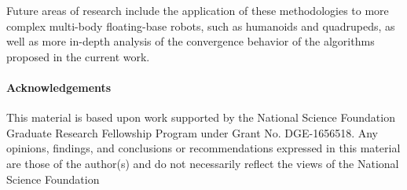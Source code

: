 \documentclass[letterpaper, 10 pt, conference]{ieeeconf}  %
\begin{document}
    Future areas of research include the application of these methodologies to more
    complex multi-body floating-base robots, such as humanoids and quadrupeds, as well as
    more in-depth analysis of the convergence behavior of the algorithms proposed in the
    current work.
    
\paragraph{Acknowledgements}
This material is based upon work supported by the National Science Foundation Graduate
Research Fellowship Program under Grant No. DGE-1656518. Any opinions, findings, and
conclusions or recommendations expressed in this material are those of the author(s) and
do not necessarily reflect the views of the National Science Foundation


\printbibliography
\end{document}
